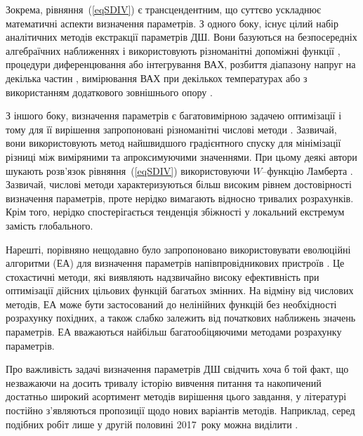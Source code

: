 Зокрема, рівняння~(\ref{eqSDIV}) є трансцендентним, що суттєво ускладнює математичні аспекти визначення параметрів.
З одного боку, існує цілий набір аналітичних методів екстракції параметрів ДШ.
Вони базуються на безпосередніх алгебраїчних наближеннях і використовують різноманітні допоміжні функції \cite{Norde,Lien,Werner,Cheung,Gromov,Lee,Bohlin,Cibils,Manifacier},
процедури  диференцювання  \cite{Mikhelashvili} або інтегрування  \cite{Kaminski,Ortiz1995,Durmus} ВАХ,
розбиття діапазону напруг на декілька частин \cite{Cataldo},
вимірювання ВАХ при декількох температурах \cite{Sato} або з використанням додаткового зовнішнього опору \cite{Lyakas}.


З іншого боку, визначення параметрів є багатовимірною задачею оптимізації і тому для її вирішення запропоновані різноманітні числові методи \cite{Ortiz1999,Evangelou,Donoval,Ferhat}.
Зазвичай, вони використовують метод найшвидшого градієнтного спуску для мінімізації різниці між виміряними та апроксимуючими значеннями.
При цьому деякі автори\cite{Lambert_Jung,Ortiz2005} шукають розв'язок рівняння~(\ref{eqSDIV}) використовуючи $W$--функцію Ламберта
\cite{LambertBook}.
Зазвичай, числові методи характеризуються більш високим рівнем достовірності визначення параметрів, проте нерідко вимагають відносно тривалих розрахунків.
Крім того, нерідко спостерігається тенденція збіжності у локальний екстремум замість глобального.

Нарешті, порівняно нещодавно було запропоновано використовувати еволюційні алгоритми (ЕА) для визначення параметрів напівпровідникових пристроїв \cite{PSO_Ye,DEWang,GA_Li,P-DE_Ishaque,TLBO_Patel,MABC,PSOWang,GA_Schottky}.
Це стохастичні методи, які виявляють надзвичайно високу ефективність при оптимізації дійсних цільових функцій багатьох змінних.
На відміну від числових методів, ЕА може бути застосований до нелінійних функцій без необхідності розрахунку похідних, а також слабко залежить від початкових наближень значень параметрів.
ЕА вважаються \cite{P-DE_Ishaque} найбільш багатообіцяючими  методами розрахунку параметрів.

Про важливість задачі визначення параметрів ДШ свідчить хоча б той факт, що
незважаючи на досить тривалу історію вивчення питання та накопичений достатньо широкий асортимент методів вирішення цього завдання,
у літературі постійно з'являються пропозиції щодо нових варіантів методів.
Наприклад, серед подібних робіт лише у другій половині 2017~року можна виділити \cite{Noise:Roy,MikhelashviliJAP2017,Cataldo,ORTIZCONDE2018}.

